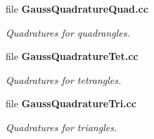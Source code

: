 \begin{DoxyCompactItemize}
file {\bf Gauss\-Quadrature\-Quad.\-cc}
\begin{DoxyCompactList}\small\item\em Quadratures for quadrangles. \end{DoxyCompactList}\item 
file {\bf Gauss\-Quadrature\-Tet.\-cc}
\begin{DoxyCompactList}\small\item\em Quadratures for tetrangles. \end{DoxyCompactList}\item 
file {\bf Gauss\-Quadrature\-Tri.\-cc}
\begin{DoxyCompactList}\small\item\em Quadratures for triangles. \end{DoxyCompactList}\end{DoxyCompactItemize}
